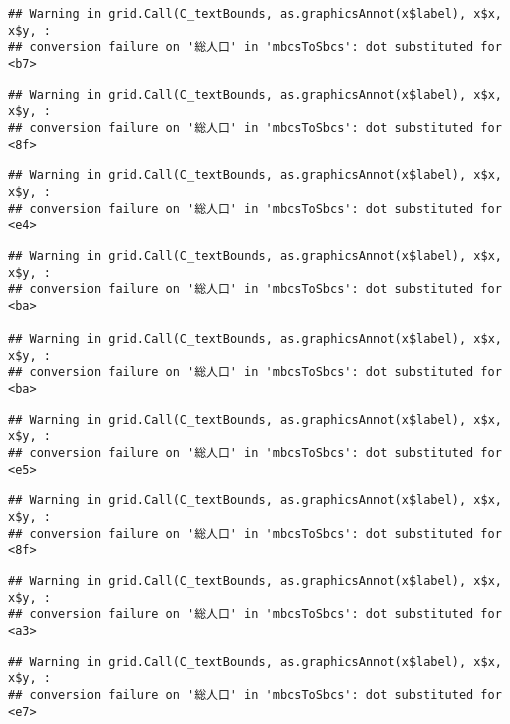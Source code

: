 \documentclass[
]{article}
\begin{document}
\begin{verbatim}
## Warning in grid.Call(C_textBounds, as.graphicsAnnot(x$label), x$x, x$y, :
## conversion failure on '総人口' in 'mbcsToSbcs': dot substituted for <b7>
\end{verbatim}

\begin{verbatim}
## Warning in grid.Call(C_textBounds, as.graphicsAnnot(x$label), x$x, x$y, :
## conversion failure on '総人口' in 'mbcsToSbcs': dot substituted for <8f>
\end{verbatim}

\begin{verbatim}
## Warning in grid.Call(C_textBounds, as.graphicsAnnot(x$label), x$x, x$y, :
## conversion failure on '総人口' in 'mbcsToSbcs': dot substituted for <e4>
\end{verbatim}

\begin{verbatim}
## Warning in grid.Call(C_textBounds, as.graphicsAnnot(x$label), x$x, x$y, :
## conversion failure on '総人口' in 'mbcsToSbcs': dot substituted for <ba>

## Warning in grid.Call(C_textBounds, as.graphicsAnnot(x$label), x$x, x$y, :
## conversion failure on '総人口' in 'mbcsToSbcs': dot substituted for <ba>
\end{verbatim}

\begin{verbatim}
## Warning in grid.Call(C_textBounds, as.graphicsAnnot(x$label), x$x, x$y, :
## conversion failure on '総人口' in 'mbcsToSbcs': dot substituted for <e5>
\end{verbatim}

\begin{verbatim}
## Warning in grid.Call(C_textBounds, as.graphicsAnnot(x$label), x$x, x$y, :
## conversion failure on '総人口' in 'mbcsToSbcs': dot substituted for <8f>
\end{verbatim}

\begin{verbatim}
## Warning in grid.Call(C_textBounds, as.graphicsAnnot(x$label), x$x, x$y, :
## conversion failure on '総人口' in 'mbcsToSbcs': dot substituted for <a3>
\end{verbatim}

\begin{verbatim}
## Warning in grid.Call(C_textBounds, as.graphicsAnnot(x$label), x$x, x$y, :
## conversion failure on '総人口' in 'mbcsToSbcs': dot substituted for <e7>
\end{verbatim}
\end{document}
